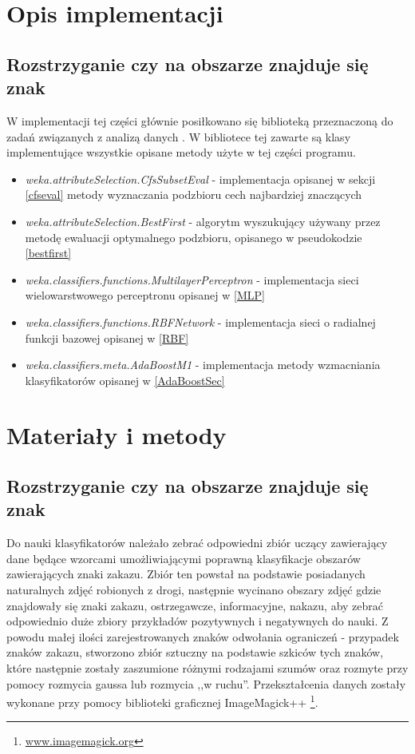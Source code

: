 \documentclass{classrep}
\begin{document}
\section{Opis implementacji}


\subsection{Rozstrzyganie czy na obszarze znajduje się znak}
W implementacji tej części głównie posiłkowano się biblioteką przeznaczoną do zadań związanych z analizą danych \cite{weka}. W bibliotece tej zawarte są klasy implementujące wszystkie opisane metody użyte w tej części programu. 

\begin{itemize}
\item \textit{\color{blue}weka.attributeSelection.CfsSubsetEval}  - implementacja opisanej w sekcji \ref{cfseval} metody wyznaczania podzbioru cech najbardziej znaczących
\item \textit{\color{blue}weka.attributeSelection.BestFirst} - algorytm wyszukujący używany przez metodę ewaluacji optymalnego podzbioru, opisanego w pseudokodzie \ref{bestfirst}
\item \textit{\color{blue}weka.classifiers.functions.MultilayerPerceptron} - implementacja sieci wielowarstwowego perceptronu opisanej w \ref{MLP}
\item
\textit{\color{blue}weka.classifiers.functions.RBFNetwork} - implementacja sieci o radialnej funkcji bazowej opisanej w \ref{RBF} 
\item \textit{\color{blue}weka.classifiers.meta.AdaBoostM1} - implementacja metody wzmacniania klasyfikatorów opisanej w \ref{AdaBoostSec}

\end{itemize}


\section{Materiały i metody}


\subsection{Rozstrzyganie czy na obszarze znajduje się znak}
Do nauki klasyfikatorów należało zebrać odpowiedni zbiór uczący zawierający dane będące wzorcami umożliwiającymi poprawną klasyfikacje obszarów zawierających znaki zakazu. Zbiór ten powstał na podstawie posiadanych naturalnych zdjęć robionych z drogi, następnie wycinano obszary zdjęć gdzie znajdowały się znaki zakazu, ostrzegawcze, informacyjne, nakazu, aby zebrać odpowiednio duże zbiory przykładów pozytywnych i negatywnych do nauki. Z powodu małej ilości zarejestrowanych znaków odwołania ograniczeń - przypadek znaków zakazu, stworzono zbiór sztuczny na podstawie szkiców tych znaków, które następnie zostały zaszumione różnymi rodzajami szumów oraz rozmyte przy pomocy rozmycia gaussa lub rozmycia ,,w ruchu''. Przekształcenia danych zostały wykonane przy pomocy biblioteki graficznej ImageMagick++ \footnote{\url{www.imagemagick.org}}.
\end{document}
